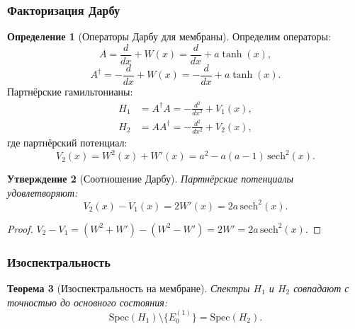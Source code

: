 \documentclass[11pt,a4paper]{article}
\newtheorem{theorem}{Теорема}[section]
\newtheorem{proposition}[theorem]{Утверждение}
\theoremstyle{definition}
\newtheorem{definition}[theorem]{Определение}
\begin{document}
\subsubsection{Факторизация Дарбу}

\begin{definition}[Операторы Дарбу для мембраны]
\label{def:membrane-darboux}
Определим операторы:
\begin{equation}
    A = \frac{d}{dx} + W(x) = \frac{d}{dx} + a \tanh(x),
    \label{eq:membrane-A}
\end{equation}
\begin{equation}
    A^\dagger = -\frac{d}{dx} + W(x) = -\frac{d}{dx} + a \tanh(x).
    \label{eq:membrane-Adag}
\end{equation}
Партнёрские гамильтонианы:
\begin{align}
    H_1 &= A^\dagger A = -\frac{d^2}{dx^2} + V_1(x),
    \label{eq:membrane-H1} \\
    H_2 &= A A^\dagger = -\frac{d^2}{dx^2} + V_2(x),
    \label{eq:membrane-H2}
\end{align}
где партнёрский потенциал:
\begin{equation}
    V_2(x) = W^2(x) + W'(x) = a^2 - a(a-1) \, \mathrm{sech}^2(x).
    \label{eq:membrane-V2}
\end{equation}
\end{definition}

\begin{proposition}[Соотношение Дарбу]
\label{prop:membrane-darboux}
Партнёрские потенциалы удовлетворяют:
\begin{equation}
    V_2(x) - V_1(x) = 2W'(x) = 2a \, \mathrm{sech}^2(x).
    \label{eq:membrane-darboux-relation}
\end{equation}
\end{proposition}

\begin{proof}
$V_2 - V_1 = (W^2 + W') - (W^2 - W') = 2W' = 2a \, \mathrm{sech}^2(x)$.
\end{proof}

\subsubsection{Изоспектральность}

\begin{theorem}[Изоспектральность на мембране]
\label{thm:membrane-isospectrality}
Спектры $H_1$ и $H_2$ совпадают с точностью до основного состояния:
\begin{equation}
    \boxed{
    \mathrm{Spec}(H_1) \setminus \{E_0^{(1)}\} = \mathrm{Spec}(H_2).
    }
    \label{eq:membrane-isospectrality}
\end{equation}
\end{theorem}
\end{document}
